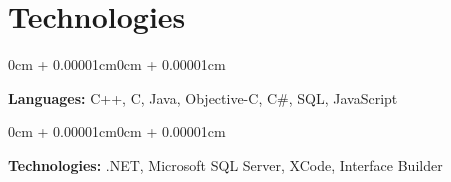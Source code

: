\documentclass[10pt, letterpaper]{article}
\newenvironment{onecolentry}{
  \begin{adjustwidth}{0cm + 0.00001cm}{0cm + 0.00001cm}
}{
  \end{adjustwidth}
}
\begin{document}
\section{Technologies}

\begin{onecolentry}
    \textbf{Languages:} C++, C, Java, Objective-C, C\#, SQL, JavaScript
\end{onecolentry}

\vspace{0.2cm}

\begin{onecolentry}
    \textbf{Technologies:} .NET, Microsoft SQL Server, XCode, Interface Builder
\end{onecolentry}
\end{document}
